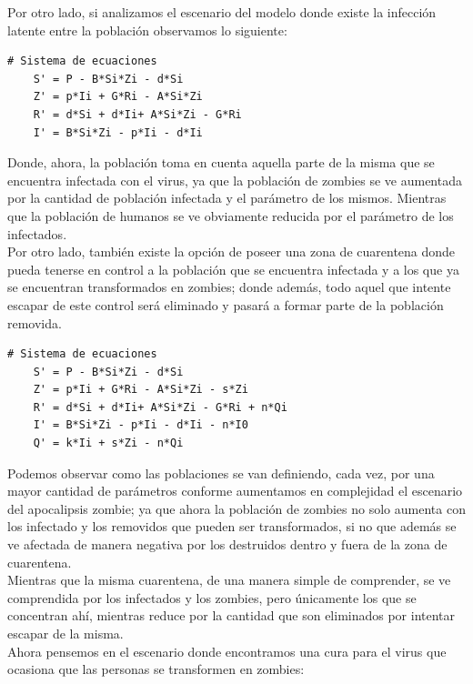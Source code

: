 \documentclass[12pt]{article}
\begin{document}
Por otro lado, si analizamos el escenario del modelo donde existe la infección latente entre la población observamos lo siguiente:

\begin{verbatim}
# Sistema de ecuaciones
    S' = P - B*Si*Zi - d*Si 
    Z' = p*Ii + G*Ri - A*Si*Zi 
    R' = d*Si + d*Ii+ A*Si*Zi - G*Ri 
    I' = B*Si*Zi - p*Ii - d*Ii 
\end{verbatim}

Donde, ahora, la población toma en cuenta aquella parte de la misma que se encuentra infectada con el virus, ya que la población de zombies se ve aumentada por la cantidad de población infectada y el parámetro de los mismos. Mientras que la población de humanos se ve obviamente reducida por el parámetro de los infectados.\\

Por otro lado, también existe la opción de poseer una zona de cuarentena donde pueda tenerse en control a la población que se encuentra infectada y a los que ya se encuentran transformados en zombies; donde además, todo aquel que intente escapar de este control será eliminado y pasará a formar parte de la población removida.\\

\begin{verbatim}
# Sistema de ecuaciones
    S' = P - B*Si*Zi - d*Si 
    Z' = p*Ii + G*Ri - A*Si*Zi - s*Zi 
    R' = d*Si + d*Ii+ A*Si*Zi - G*Ri + n*Qi 
    I' = B*Si*Zi - p*Ii - d*Ii - n*I0 
    Q' = k*Ii + s*Zi - n*Qi 
\end{verbatim}

Podemos observar como las poblaciones se van definiendo, cada vez, por una mayor cantidad de parámetros conforme aumentamos en complejidad el escenario del apocalipsis zombie; ya que ahora la población de zombies no solo aumenta con los infectado y los removidos que pueden ser transformados, si no que además se ve afectada de manera negativa por los destruidos dentro y fuera de la zona de cuarentena.\\

Mientras que la misma cuarentena, de una manera simple de comprender, se ve comprendida por los infectados y los zombies, pero únicamente los que se concentran ahí, mientras reduce por la cantidad que son eliminados por intentar escapar de la misma.\\

Ahora pensemos en el escenario donde encontramos una cura para el virus que ocasiona que las personas se transformen en zombies:\\
\end{document}
